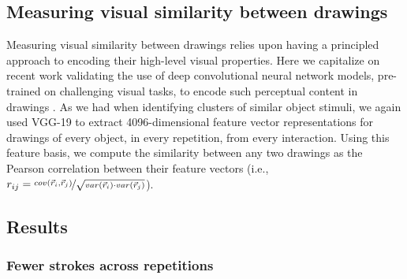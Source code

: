 \documentclass[10pt,letterpaper]{article}
\begin{document}



\subsection{Measuring visual similarity between drawings}

Measuring visual similarity between drawings relies upon having a principled approach to encoding their high-level visual properties.
Here we capitalize on recent work validating the use of deep convolutional neural network models, pre-trained on challenging visual tasks, to encode such perceptual content in drawings \cite{FanCommon2018}.
As we had when identifying clusters of similar object stimuli, we again used VGG-19 to extract 4096-dimensional feature vector representations for drawings of every object, in every repetition, from every interaction. 
Using this feature basis, we compute the similarity between any two drawings as the Pearson correlation between their feature vectors (i.e., $r_{ij} =  \nicefrac{cov(\vec{r}_{i}, \vec{r}_{j})}{\sqrt{var(\vec{r}_{i}) \cdot var(\vec{r}_{j})}}$).

\subsection{Results}

\subsubsection{Fewer strokes across repetitions} 
\end{document}
